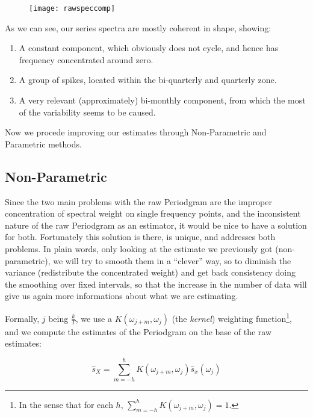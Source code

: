\documentclass[12pt]{article} %
\begin{document}
\begin{figure}[H]
\begin{center}
\texttt{[image: rawspeccomp]}
\caption{}
\end{center}
\end{figure}

As we can see, our series spectra are mostly coherent in shape, showing:

\begin{enumerate}
\item A constant component, which obviously does not cycle, and hence has frequency concentrated around zero.
\item A group of spikes, located within the bi-quarterly and quarterly zone.
\item A very relevant (approximately) bi-monthly component, from which the most of the variability seems to be caused.
\end{enumerate}

Now we procede improving our estimates through Non-Parametric and Parametric methods.

\subsection{Non-Parametric}

Since the two main problems with the raw Periodgram are the improper concentration of spectral weight on single frequency points, and the inconsistent nature of the raw Periodgram as an estimator, it would be nice to have a solution for both. Fortunately this solution is there, is unique, and addresses both problems. In plain words, only looking at the estimate we previously got (non-parametric), we will try to smooth them in a ``clever'' way, so to diminish the variance (redistribute the concentrated weight) and get back consistency doing the smoothing over fixed intervals, so that the increase in the number of data will give us again more informations about what we are estimating.

Formally, $j$ being $\frac{k}{T}$, we use a $K(\omega_{j+m},\omega_j)$ (the {\em kernel}) weighting function\footnote{
In the sense that for each $h$, $\sum_{m=-h}^{h}K(\omega_{j+m},\omega_j)=1$.}, and we compute the estimates of the Periodgram on the base of the raw estimates:

\begin{equation}
\hat{s}_X=\sum\limits_{m=-h}^{h} K(\omega_{j+m},\omega_j)\hat{s}_x(\omega_j)
\end{equation}
\end{document}
